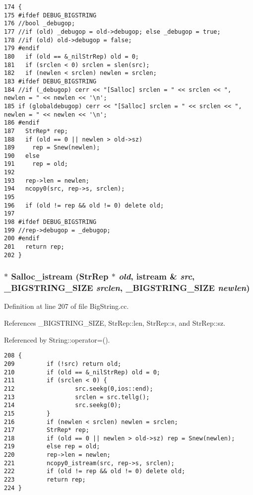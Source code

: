 \footnotesize\begin{verbatim}174 {
175 #ifdef DEBUG_BIGSTRING
176 //bool _debugop;
177 //if (old) _debugop = old->debugop; else _debugop = true;
178 //if (old) old->debugop = false;
179 #endif
180   if (old == &_nilStrRep) old = 0;
181   if (srclen < 0) srclen = slen(src);
182   if (newlen < srclen) newlen = srclen;
183 #ifdef DEBUG_BIGSTRING
184 //if (_debugop) cerr << "[Salloc] srclen = " << srclen << ", newlen = " << newlen << '\n';
185 if (globaldebugop) cerr << "[Salloc] srclen = " << srclen << ", newlen = " << newlen << '\n';
186 #endif
187   StrRep* rep;
188   if (old == 0 || newlen > old->sz)
189     rep = Snew(newlen);
190   else
191     rep = old;
192 
193   rep->len = newlen;
194   ncopy0(src, rep->s, srclen);
195 
196   if (old != rep && old != 0) delete old;
197 
198 #ifdef DEBUG_BIGSTRING
199 //rep->debugop = _debugop;
200 #endif
201   return rep;
202 }
\end{verbatim}\normalsize 
{}
\subsubsection{$\ast$ Salloc\_\-istream ({\bf Str\-Rep} $\ast$ {\em old}, istream \& {\em src}, {\bf \_\-BIGSTRING\_\-SIZE} {\em srclen}, {\bf \_\-BIGSTRING\_\-SIZE} {\em newlen})}\label{BigString_8hh_a25}




Definition at line 207 of file Big\-String.cc.

References \_\-BIGSTRING\_\-SIZE, Str\-Rep::len, Str\-Rep::s, and Str\-Rep::sz.

Referenced by String::operator=().



\footnotesize\begin{verbatim}208 {
209         if (!src) return old;
210         if (old == &_nilStrRep) old = 0;
211         if (srclen < 0) {
212                 src.seekg(0,ios::end);
213                 srclen = src.tellg();
214                 src.seekg(0);
215         }
216         if (newlen < srclen) newlen = srclen;
217         StrRep* rep;
218         if (old == 0 || newlen > old->sz) rep = Snew(newlen);
219         else rep = old;
220         rep->len = newlen;
221         ncopy0_istream(src, rep->s, srclen);
222         if (old != rep && old != 0) delete old;
223         return rep;
224 }
\end{verbatim}\normalsize 
{}
